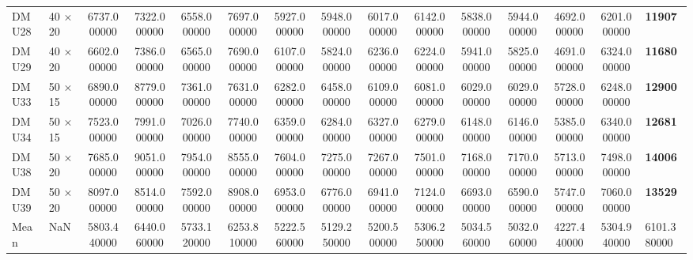 \begin{tabular}{llcccccccccccc}
DMU28 & 40 × 20 & 6737.000000 & 7322.000000 & 6558.000000 & 7697.000000 & 5927.000000 & 5948.000000 & 6017.000000 & 6142.000000 & 5838.000000 & 5944.000000 & 4692.000000 & 6201.000000 & \textbf{11907} \\
DMU29 & 40 × 20 & 6602.000000 & 7386.000000 & 6565.000000 & 7690.000000 & 6107.000000 & 5824.000000 & 6236.000000 & 6224.000000 & 5941.000000 & 5825.000000 & 4691.000000 & 6324.000000 & \textbf{11680} \\
DMU33 & 50 × 15 & 6890.000000 & 8779.000000 & 7361.000000 & 7631.000000 & 6282.000000 & 6458.000000 & 6109.000000 & 6081.000000 & 6029.000000 & 6029.000000 & 5728.000000 & 6248.000000 & \textbf{12900} \\
DMU34 & 50 × 15 & 7523.000000 & 7991.000000 & 7026.000000 & 7740.000000 & 6359.000000 & 6284.000000 & 6327.000000 & 6279.000000 & 6148.000000 & 6146.000000 & 5385.000000 & 6340.000000 & \textbf{12681} \\
DMU38 & 50 × 20 & 7685.000000 & 9051.000000 & 7954.000000 & 8555.000000 & 7604.000000 & 7275.000000 & 7267.000000 & 7501.000000 & 7168.000000 & 7170.000000 & 5713.000000 & 7498.000000 & \textbf{14006} \\
DMU39 & 50 × 20 & 8097.000000 & 8514.000000 & 7592.000000 & 8908.000000 & 6953.000000 & 6776.000000 & 6941.000000 & 7124.000000 & 6693.000000 & 6590.000000 & 5747.000000 & 7060.000000 & \textbf{13529} \\
Mean & NaN & 5803.440000 & 6440.060000 & 5733.120000 & 6253.810000 & 5222.560000 & 5129.250000 & 5200.500000 & 5306.250000 & 5034.560000 & 5032.060000 & 4227.440000 & 5304.940000 & 6101.380000 \\
\bottomrule
\end{tabular}
